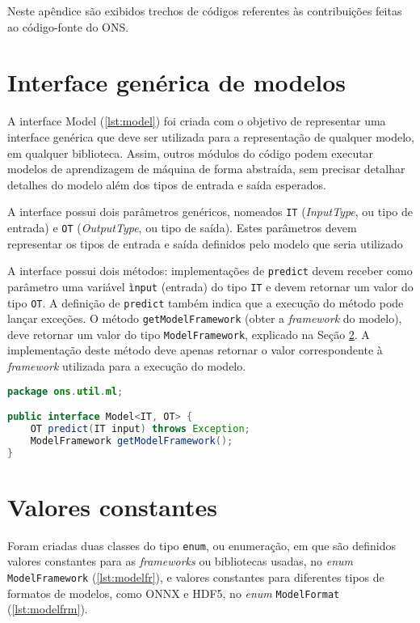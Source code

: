 Neste apêndice são exibidos trechos de códigos referentes às contribuições feitas ao código-fonte do \acrfull{ONS}.

\section{Interface genérica de modelos}
\label{appendix-ons-model}

A interface Model (\ref{lst:model}) foi criada com o objetivo de representar uma interface genérica que deve ser utilizada para a representação de qualquer modelo, em qualquer biblioteca. Assim, outros módulos do código podem executar modelos de aprendizagem de máquina de forma abstraída, sem precisar detalhar detalhes do modelo além dos tipos de entrada e saída esperados.

A interface possui dois parâmetros genéricos, nomeados \texttt{IT} (\textit{InputType}, ou tipo de entrada) e \texttt{OT} (\textit{OutputType}, ou tipo de saída). Estes parâmetros devem representar os tipos de entrada e saída definidos pelo modelo que seria utilizado

A interface possui dois métodos: implementações de \texttt{predict} devem receber como parâmetro uma variável \texttt{ìnput} (entrada) do tipo \texttt{IT} e devem retornar um valor do tipo \texttt{OT}. A definição de \texttt{predict} também indica que a execução do método pode lançar exceções. O método \texttt{getModelFramework} (obter a \textit{framework} do modelo), deve retornar um valor do tipo \texttt{ModelFramework}, explicado na Seção \ref{appendix-ons-enums}. A implementação deste método deve apenas retornar o valor correspondente à \textit{framework} utilizada para a execução do modelo.

\begin{lstlisting}[language=Java, caption=Implementação da interface Model, label={lst:model}]
package ons.util.ml;

public interface Model<IT, OT> {
    OT predict(IT input) throws Exception;
    ModelFramework getModelFramework();
}
\end{lstlisting}

\section{Valores constantes}
\label{appendix-ons-enums}

Foram criadas duas classes do tipo \texttt{enum}, ou enumeração, em que são definidos valores constantes para as \textit{frameworks} ou bibliotecas usadas, no \textit{enum} \texttt{ModelFramework} (\ref{lst:modelfr}), e valores constantes para diferentes tipos de formatos de modelos, como ONNX e HDF5, no \textit{enum} \texttt{ModelFormat} (\ref{lst:modelfrm}).

